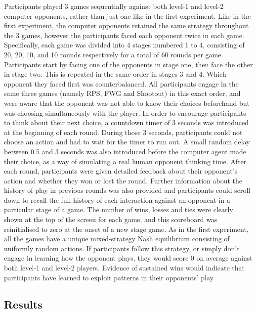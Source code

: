 \documentclass[man,floatsintext]{apa6}
\begin{document}
Participants played 3 games sequentially against both level-1 and level-2 computer opponents, rather than just one like in the first experiment. Like in the first experiment, the computer opponents retained the same strategy throughout the 3 games, however the participants faced each opponent twice in each game. Specifically, each game was divided into 4 stages numbered 1 to 4, consisting of 20, 20, 10, and 10 rounds respectively for a total of 60 rounds per game. Participants start by facing one of the opponents in stage one, then face the other in stage two. This is repeated in the same order in stages 3 and 4. Which opponent they faced first was counterbalanced. All participants engage in the same three games (namely RPS, FWG and Shootout) in this exact order, and were aware that the opponent was not able to know their choices beforehand but was choosing simultaneously with the player.
In order to encourage participants to think about their next choice, a countdown timer of 3 seconds was introduced at the beginning of each round. During those 3 seconds, participants could not choose an action and had to wait for the timer to run out. A small random delay between 0.5 and 3 seconds was also introduced before the computer agent made their choice, as a way of simulating a real human opponent thinking time. After each round, participants were given detailed feedback about their opponent's action and whether they won or lost the round. Further information about the history of play in previous rounds was also provided and participants could scroll down to recall the full history of each interaction against an opponent in a particular stage of a game. The number of wins, losses and ties were clearly shown at the top of the screen for each game, and this scoreboard was reinitialised to zero at the onset of a new stage game.
As in the first experiment, all the games have a unique mixed-strategy Nash equilibrium consisting of uniformly random actions. If participants follow this strategy, or simply don't engage in learning how the opponent plays, they would score 0 on average against both level-1 and level-2 players. Evidence of sustained wins would indicate that participants have learned to exploit patterns in their opponents' play.

\hypertarget{results-1}{%
\subsection{Results}\label{results-1}}
\end{document}
